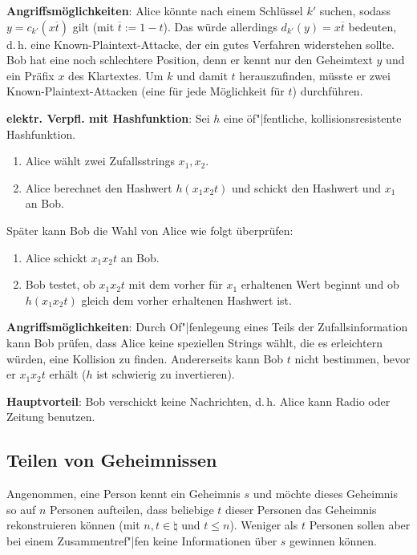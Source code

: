\textbf{Angriffsmöglichkeiten}:
Alice könnte nach einem Schlüssel $k'$ suchen, sodass $y = c_{k'}(x\overline{t})$ gilt
(mit $\overline{t} := 1 - t$).
Das würde allerdings $d_{k'}(y) = x\overline{t}$ bedeuten,
d.\,h. eine Known-Plaintext-Attacke, der ein gutes Verfahren widerstehen sollte.
Bob hat eine noch schlechtere Position, denn er kennt nur den Geheimtext $y$ und
ein Präfix $x$ des Klartextes.
Um $k$ und damit $t$ herauszufinden, müsste er zwei Known-Plaintext-Attacken
(eine für jede Möglichkeit für $t$) durchführen.

\linie

\textbf{elektr. Verpfl. mit Hashfunktion}:
Sei $h$ eine öf"|fentliche, kollisionsresistente Hashfunktion.
\begin{enumerate}
    \item
    Alice wählt zwei Zufallsstrings $x_1, x_2$.
    
    \item
    Alice berechnet den Hashwert $h(x_1 x_2 t)$ und schickt den Hashwert und $x_1$ an Bob.
\end{enumerate}
Später kann Bob die Wahl von Alice wie folgt überprüfen:
\begin{enumerate}
    \item
    Alice schickt $x_1 x_2 t$ an Bob.
    
    \item
    Bob testet, ob $x_1 x_2 t$ mit dem vorher für $x_1$ erhaltenen Wert beginnt und ob
    $h(x_1 x_2 t)$ gleich dem vorher erhaltenen Hashwert ist.
\end{enumerate}

\textbf{Angriffsmöglichkeiten}:
Durch Of"|fenlegeung eines Teils der Zufallsinformation kann Bob prüfen,
dass Alice keine speziellen Strings wählt, die es erleichtern würden, eine Kollision zu finden.
Andererseits kann Bob $t$ nicht bestimmen, bevor er $x_1 x_2 t$ erhält
($h$ ist schwierig zu invertieren).

\textbf{Hauptvorteil}:
Bob verschickt keine Nachrichten, d.\,h. Alice kann Radio oder Zeitung benutzen.

\pagebreak

\subsection{%
    Teilen von Geheimnissen%
}

Angenommen, eine Person kennt ein Geheimnis $s$ und möchte dieses Geheimnis so auf
$n$ Personen aufteilen, dass beliebige $t$ dieser Personen das Geheimnis rekonstruieren können
(mit $n, t \in \natural$ und $t \le n$).
Weniger als $t$ Personen sollen aber bei einem Zusammentref"|fen keine Informationen über $s$
gewinnen können.

